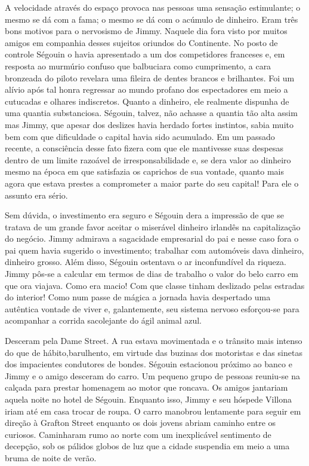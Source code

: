 A velocidade através do espaço provoca nas pessoas uma sensação
estimulante; o mesmo se dá com a fama; o mesmo se dá com o acúmulo de
dinheiro. Eram três bons motivos para o nervosismo de Jimmy. Naquele
dia fora visto por muitos amigos em companhia desses sujeitos oriundos
do Continente. No posto de controle Ségouin o havia apresentado a um
dos competidores franceses e, em resposta ao murmúrio confuso que
balbuciara como cumprimento, a cara bronzeada do piloto revelara uma
fileira de dentes brancos e brilhantes. Foi um alívio após tal honra
regressar ao mundo profano dos espectadores em meio a cutucadas e
olhares indiscretos. Quanto a dinheiro, ele realmente dispunha de
uma quantia substanciosa. Ségouin, talvez, não achasse a quantia tão
alta assim mas Jimmy, que apesar dos deslizes havia herdado fortes
instintos, sabia muito bem com que dificuldade o capital havia sido
acumulado. Em um passado recente, a consciência desse fato fizera
com que ele mantivesse suas despesas dentro de um limite razoável de
irresponsabilidade e, se dera valor ao dinheiro mesmo na época em que
satisfazia os caprichos de sua vontade, quanto mais agora que estava
prestes a comprometer a maior parte do seu capital! Para ele o assunto
era sério.

Sem dúvida, o investimento era seguro e Ségouin dera a impressão de
que se tratava de um grande favor aceitar o miserável dinheiro
irlandês na capitalização do negócio. Jimmy admirava a sagacidade
empresarial do pai e nesse caso fora o pai quem havia sugerido o
investimento; trabalhar com automóveis dava dinheiro, dinheiro
grosso. Além disso, Ségouin ostentava o ar inconfundível da riqueza.
Jimmy pôs-se a calcular em termos de dias de
trabalho o valor do belo carro em que ora viajava. Como era macio! Com
que classe tinham deslizado pelas estradas do interior! Como num
passe de mágica a jornada havia despertado uma autêntica vontade de
viver e, galantemente, seu sistema nervoso esforçou-se para acompanhar
a corrida sacolejante do ágil animal azul.

Desceram pela Dame Street. A rua estava movimentada e o trânsito mais
intenso do que de hábito,barulhento, em virtude das buzinas dos
motoristas e das sinetas dos impacientes condutores de bondes. Ségouin
estacionou próximo ao banco e Jimmy e o amigo desceram do carro. Um
pequeno grupo de pessoas reuniu-se na calçada para prestar homenagem
ao motor que roncava. Os amigos jantariam aquela noite no hotel de
Ségouin. Enquanto isso, Jimmy e seu hóspede Villona iriam até em
casa trocar de roupa. O carro manobrou lentamente para seguir em
direção à Grafton Street enquanto os dois jovens abriam caminho entre
os curiosos. Caminharam rumo ao norte com um inexplicável sentimento
de decepção, sob os pálidos globos de luz que a cidade suspendia em
meio a uma bruma de noite de verão.

